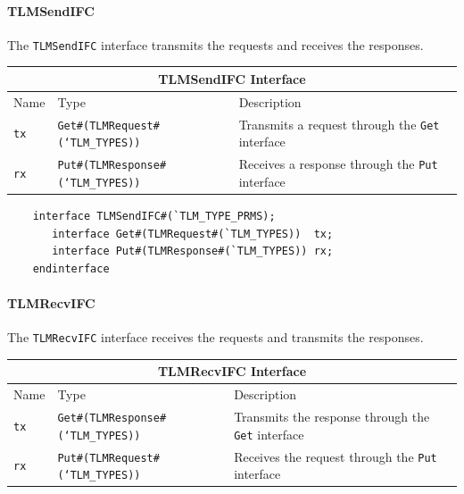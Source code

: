 \documentclass[twoside,letterpaper]{article}
\newcommand{\te}[1]{\texttt{#1}}
\begin{document}
\paragraph{\bf TLMSendIFC}
The \te{TLMSendIFC} interface transmits the requests and receives the
responses.



\begin{center}
\begin{tabular}{|p{.5 in}|p{2.5 in}|p{3 in}|}
\hline
\multicolumn{3}{|c|}{TLMSendIFC Interface}\\
\hline
Name & Type & Description \\
\hline
\hline 
\te{tx}  &\te{Get\#(TLMRequest\#(`TLM\_TYPES))}  &Transmits a request
through the \te{Get} interface \\
\hline
\te{rx}  &\te{Put\#(TLMResponse\#(`TLM\_TYPES))}  &Receives a response
through the \te{Put} interface\\
\hline
\end{tabular}
\end{center}


\begin{verbatim}
    interface TLMSendIFC#(`TLM_TYPE_PRMS);
       interface Get#(TLMRequest#(`TLM_TYPES))  tx;
       interface Put#(TLMResponse#(`TLM_TYPES)) rx;
    endinterface
\end{verbatim}


\paragraph{\bf TLMRecvIFC}
The \te{TLMRecvIFC} interface receives the requests and transmits the responses.

\begin{center}
\begin{tabular}{|p{.5 in}|p{2.5 in}|p{3 in}|}
\hline
\multicolumn{3}{|c|}{TLMRecvIFC Interface}\\
\hline
Name & Type & Description \\
\hline
\hline 
\te{tx}  &\te{Get\#(TLMResponse\#(`TLM\_TYPES))}  &Transmits the
response through the \te{Get} interface\\
\hline
\te{rx}  &\te{Put\#(TLMRequest\#(`TLM\_TYPES))}  &Receives the request
through the \te{Put} interface\\
\hline
\end{tabular}
\end{center}
\end{document}
